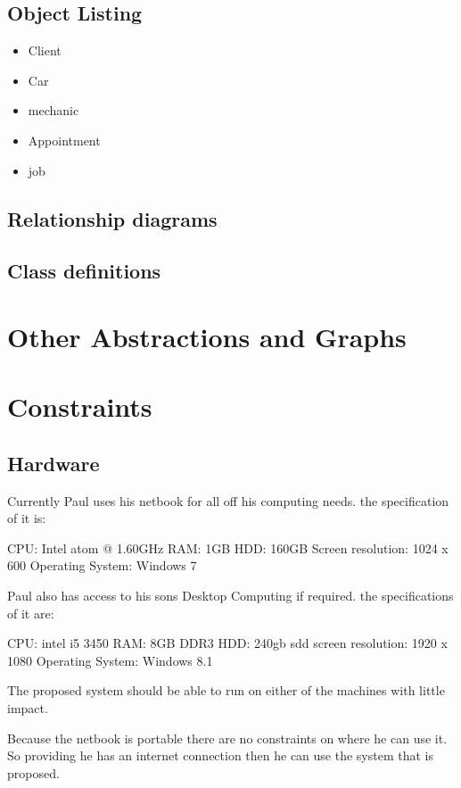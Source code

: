 	\subsection{Object Listing}
	
	\begin{itemize}
	
	\item Client
	\item Car
	\item mechanic
	\item Appointment
	\item job
	\end{itemize}

	\subsection{Relationship diagrams}

	\subsection{Class definitions}

\section{Other Abstractions and Graphs}

\section{Constraints}

	\subsection{Hardware}
	Currently Paul uses his netbook for all off his computing needs.
	the specification of it is:
	
	CPU: Intel atom @ 1.60GHz
	RAM: 1GB
	HDD: 160GB
	Screen resolution:  1024 x 600
	Operating System: Windows 7
	
	Paul also has access to his sons Desktop Computing if required. the specifications of it are:
	
	CPU: intel i5 3450
	RAM: 8GB DDR3
	HDD: 240gb sdd
	screen resolution: 1920 x 1080
	Operating System: Windows 8.1
	
The proposed system should be able to run on either of the machines with little impact.

Because the netbook is portable there are no constraints on where he can use it. So providing he has an internet connection then he can use the system that is proposed.


